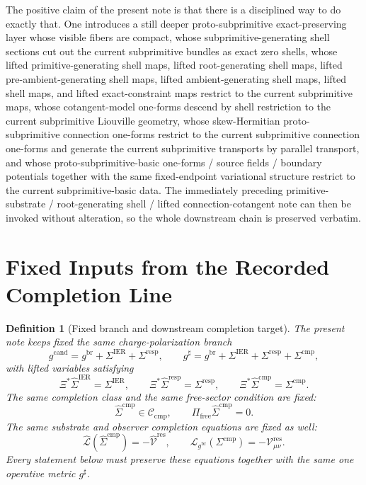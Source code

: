 \documentclass[11pt]{article}
\newcommand{\ObserverMap}{\Xi}
\newcommand{\ObserverMetric}{g^{\mathrm{br}}}
\newcommand{\CandidateMetric}{g^{\mathrm{cand}}}
\newcommand{\CompletedMetric}{g^{\sharp}}
\newcommand{\BaseShift}{\Sigma^{\mathrm{IER}}}
\newcommand{\ResponseShift}{\Sigma^{\mathrm{resp}}}
\newcommand{\CompShift}{\Sigma^{\mathrm{cmp}}}
\newcommand{\BaseLift}{\widehat\Sigma^{\mathrm{IER}}}
\newcommand{\ResponseLift}{\widehat\Sigma^{\mathrm{resp}}}
\newcommand{\CompLift}{\widehat\Sigma^{\mathrm{cmp}}}
\newcommand{\ResidualCore}{\mathcal V_{\mu\nu}^{\mathrm{res}}}
\newcommand{\ResidualLift}{\widehat{\mathcal V}^{\mathrm{res}}}
\newcommand{\SubReducedEin}{\widehat{\mathcal L}}
\newcommand{\FreeProj}{\Pi_{\mathrm{free}}}
\newcommand{\ReducedEin}{\mathcal L_{\ObserverMetric}}
\newcommand{\CompClass}{\mathscr C_{\mathrm{cmp}}}
\newtheorem{definition}{Definition}
\begin{document}
The positive claim of the present note is that there is a disciplined way to do exactly that. One introduces a still deeper proto-subprimitive exact-preserving layer whose visible fibers are compact, whose subprimitive-generating shell sections cut out the current subprimitive bundles as exact zero shells, whose lifted primitive-generating shell maps, lifted root-generating shell maps, lifted pre-ambient-generating shell maps, lifted ambient-generating shell maps, lifted shell maps, and lifted exact-constraint maps restrict to the current subprimitive maps, whose cotangent-model one-forms descend by shell restriction to the current subprimitive Liouville geometry, whose skew-Hermitian proto-subprimitive connection one-forms restrict to the current subprimitive connection one-forms and generate the current subprimitive transports by parallel transport, and whose proto-subprimitive-basic one-forms / source fields / boundary potentials together with the same fixed-endpoint variational structure restrict to the current subprimitive-basic data. The immediately preceding primitive-substrate / root-generating shell / lifted connection-cotangent note can then be invoked without alteration, so the whole downstream chain is preserved verbatim.

\section{Fixed Inputs from the Recorded Completion Line}

\begin{definition}[Fixed branch and downstream completion target]
\label{def:fixed_branch}
The present note keeps fixed the same charge-polarization branch
\begin{equation}
\CandidateMetric
=
\ObserverMetric+\BaseShift+\ResponseShift,
\qquad
\CompletedMetric
=
\ObserverMetric+\BaseShift+\ResponseShift+\CompShift,
\label{eq:fixed_metrics}
\end{equation}
with lifted variables satisfying
\begin{equation}
\ObserverMap^*\BaseLift=\BaseShift,
\qquad
\ObserverMap^*\ResponseLift=\ResponseShift,
\qquad
\ObserverMap^*\CompLift=\CompShift.
\label{eq:fixed_lifts}
\end{equation}
The same completion class and the same free-sector condition are fixed:
\begin{equation}
\CompLift\in\CompClass,
\qquad
\FreeProj\CompLift=0.
\label{eq:fixed_free}
\end{equation}
The same substrate and observer completion equations are fixed as well:
\begin{equation}
\SubReducedEin(\CompLift)=-\ResidualLift,
\qquad
\ReducedEin(\CompShift)=-\ResidualCore.
\label{eq:fixed_solves}
\end{equation}
Every statement below must preserve these equations together with the same one operative metric \(\CompletedMetric\).
\end{definition}
\end{document}
